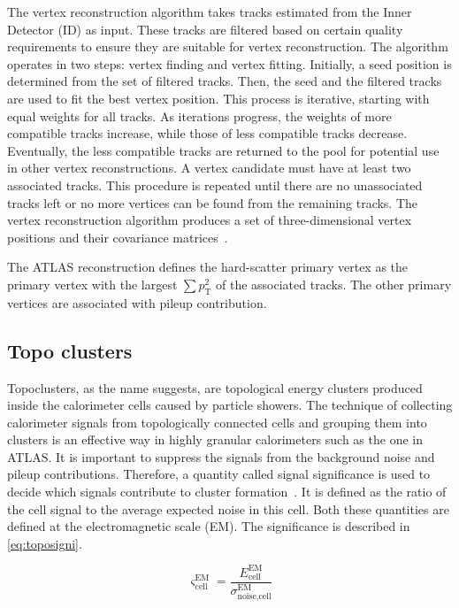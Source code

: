 The vertex reconstruction algorithm takes tracks estimated from the Inner Detector (ID) as input. These tracks are filtered based on certain quality requirements to ensure 
they are suitable for vertex reconstruction. The algorithm operates in two steps: vertex finding and vertex fitting. Initially, a seed position is determined from the set of 
filtered tracks. Then, the seed and the filtered tracks are used to fit the best vertex position. This process is iterative, starting with equal weights for all tracks. As iterations 
progress, the weights of more compatible tracks increase, while those of less compatible tracks decrease. Eventually, the less compatible tracks are returned to the pool for potential 
use in other vertex reconstructions. A vertex candidate must have at least two associated tracks. This procedure is repeated until there are no unassociated tracks left or no more 
vertices can be found from the remaining tracks. The vertex reconstruction algorithm produces a set of three-dimensional vertex positions and their covariance 
matrices~\cite{F_Meloni_vertex}.

The ATLAS reconstruction defines the hard-scatter primary vertex as the primary vertex with the
largest $\sum p_{\text{T}}^2$ of the associated tracks. The other primary vertices are associated
with pileup contribution. 

\subsection{Topo clusters}
Topoclusters, as the name suggests, are topological energy clusters produced inside the calorimeter 
cells caused by particle showers. The technique of collecting calorimeter signals from topologically 
connected cells and grouping them into clusters is an effective way in 
highly granular calorimeters such as the one in ATLAS. It is important to suppress the signals from the
background noise and pileup contributions. Therefore, a quantity called signal significance is used to
decide which signals contribute to cluster formation~\cite{PERF-2014-07}. It is defined as the ratio of 
the cell signal to the average expected noise in this cell. Both these quantities are defined at the 
electromagnetic scale (EM). The significance is described in \cref{eq:toposigni}.

\begin{equation}
    \varsigma_{\text{cell}}^{\text{EM}} = \frac{E_{\text{cell}}^{\text{EM}}}{\sigma_{\text{noise,cell}}^{\text{EM}}}
    \label{eq:toposigni}
\end{equation}

